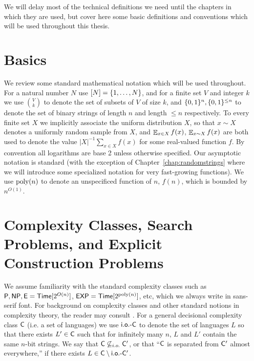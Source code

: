 
We will delay most of the technical definitions we need until the chapters in which they are used, but cover here some basic definitions and conventions which will be used throughout this thesis.
\section{Basics}
We review some standard mathematical notation which will be used throughout. For a natural number $N$ use $[N] =\{1,\ldots,N\}$, and for a finite set $V$ and integer $k$ we use $\binom{V}{k}$ to denote the set of subsets of $V$ of size $k$, and $\{0,1\}^n, \{0,1\}^{\leq n}$ to denote the set of binary strings of length $n$ and length $\leq n$ respectively. To every finite set $X$ we implicitly associate the uniform distribution $X$, so that $x \sim X$ denotes a uniformly random sample from $X$, and $\mathop{\mathbb{E}}_{x \in X} f(x) $, $ \mathop{\mathbb{E}}_{x \sim X} f(x)$ are both used to denote the value $|X|^{-1} \sum_{x \in X} f(x)$ for some real-valued function $f$. By convention all logarithms are base 2 unless otherwise specified. Our asymptotic notation is standard (with the exception of Chapter~\ref{chap:randomstrings} where we will introduce some specialized notation for very fast-growing functions).
We use $\mathrm{poly}(n)$ to denote an unspecificed function of $n$, $f(n)$, which is bounded by $n^{O(1)}$. 

\section{Complexity Classes, Search Problems, and Explicit Construction Problems}

We assume familiarity with the standard complexity classes such as $\cl{P}, \cl{NP}, \cl{E} = \cl{Time}[2^{O(n)}]$, $\cl{EXP} = \cl{Time}[2^{\poly(n)}]$, etc, which we always write in sans-serif font. For background on complexity classes and other standard notions in complexity theory, the reader may consult \cite{arora-barak}. For a general decisional complexity class $\cl{C}$ (i.e. a set of languages) we use $\mathsf{i.o.\text{-} C}$ to denote the set of languages $L$ so that there exists $L' \in \cl{C}$ such that for infinitely many $n$, $L$ and $L'$ contain the same $n$-bit strings. We say that $\cl{C} \not\subseteq_{i.o.} \cl{C'}$, or that ``$\cl{C}$ is separated from $\cl{C'}$ almost everywhere,'' if there exists $L \in \cl{C} \setminus \cl{i.o.\dash C'}$. 
 
